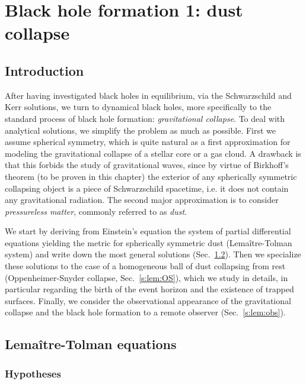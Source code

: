 \chapter{Black hole formation 1: dust collapse}
\label{s:lem}

\minitoc

\section{Introduction}

After having investigated black holes in equilibrium, via the
Schwarzschild and Kerr solutions, we turn to dynamical black holes,
more specifically to the standard process of
black hole formation: \emph{gravitational collapse}.
To deal with analytical solutions, we simplify the problem as much as
possible. First we assume spherical symmetry, which is quite natural
as a first approximation for modeling the gravitational collapse
of a stellar core or a gas cloud. A drawback is that this forbids the
study of gravitational waves, since by
virtue of Birkhoff's theorem (to be proven in this chapter)
the exterior
of any spherically symmetric collapsing object is a piece of Schwarzschild
spacetime, i.e. it does not contain any gravitational radiation.
The second major approximation is to consider \emph{pressureless matter},
commonly referred to as \emph{dust}.

We start by deriving from Einstein's equation the system of partial differential
equations yielding the metric for spherically symmetric dust (Lemaître-Tolman
system) and write down the most general solutions (Sec.~\ref{s:lem:LT_equat}).
Then we specialize these solutions to the case of a homogeneous ball of dust
collapsing from rest (Oppenheimer-Snyder collapse, Sec.~\ref{s:lem:OS}),
which we study in details, in particular regarding the birth of the event
horizon and the existence of trapped surfaces. Finally, we consider
the observational appearance of the gravitational collapse and the black hole
formation to a remote observer (Sec.~\ref{s:lem:obs}).



\section{Lemaître-Tolman equations} \label{s:lem:LT_equat}

\subsection{Hypotheses} \label{s:lem:hyp}

